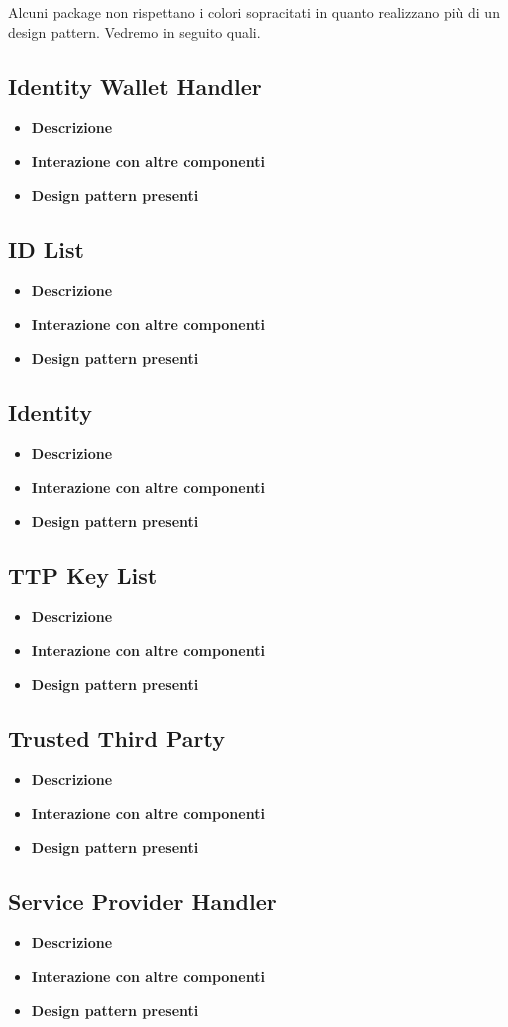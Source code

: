 Alcuni package non rispettano i colori sopracitati in quanto realizzano più di un design pattern. Vedremo in seguito quali.
\subsection{Identity Wallet Handler}
\begin{itemize}
	\item \textbf{Descrizione}
	\item \textbf{Interazione con altre componenti}
	\item \textbf{Design pattern presenti}
\end{itemize}
\subsection{ID List}
\begin{itemize}
	\item \textbf{Descrizione}
	\item \textbf{Interazione con altre componenti}
	\item \textbf{Design pattern presenti}
\end{itemize}
\subsection{Identity}
\begin{itemize}
	\item \textbf{Descrizione}
	\item \textbf{Interazione con altre componenti}
	\item \textbf{Design pattern presenti}
\end{itemize}
\subsection{TTP Key List}
\begin{itemize}
	\item \textbf{Descrizione}
	\item \textbf{Interazione con altre componenti}
	\item \textbf{Design pattern presenti}
\end{itemize}
\subsection{Trusted Third Party}
\begin{itemize}
	\item \textbf{Descrizione}
	\item \textbf{Interazione con altre componenti}
	\item \textbf{Design pattern presenti}
\end{itemize}
\subsection{Service Provider Handler}
\begin{itemize}
	\item \textbf{Descrizione}
	\item \textbf{Interazione con altre componenti}
	\item \textbf{Design pattern presenti}
\end{itemize}